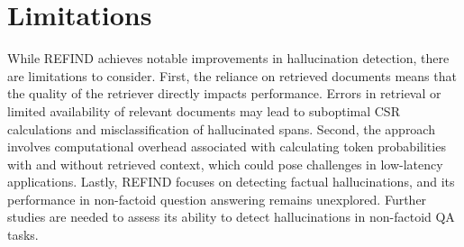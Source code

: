 \section*{Limitations}

While REFIND achieves notable improvements in hallucination detection, there are limitations to consider. First, the reliance on retrieved documents means that the quality of the retriever directly impacts performance. Errors in retrieval or limited availability of relevant documents may lead to suboptimal CSR calculations and misclassification of hallucinated spans. Second, the approach involves computational overhead associated with calculating token probabilities with and without retrieved context, which could pose challenges in low-latency applications. Lastly, REFIND focuses on detecting factual hallucinations, and its performance in non-factoid question answering \cite{Bolotova2022NFQATaxanomy, Lee2025Typed-RAG} remains unexplored. Further studies are needed to assess its ability to detect hallucinations in non-factoid QA tasks.

